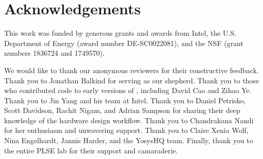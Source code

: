 \section*{Acknowledgements}

This work was funded
  by generous grants
  and awards
  from
  Intel,
  the U.S. Department
  of Energy (award number DE-SC0022081),
  and the NSF (grant numbers 1836724 and 1749570).






We would like to thank
  our anonymous reviewers
  for their constructive feedback.
Thank you to
  Jonathan Balkind for serving
  as our shepherd.
Thank you to those who contributed code
  to early versions of \lr, including
  David Cao and Zihao Ye.
Thank you to Jin Yang and his
  team at Intel.
Thank you to 
  Daniel Petrisko, Scott Davidson,
  Rachit Nigam, and Adrian Sampson
  for sharing their deep knowledge of
  the hardware design workflow.
Thank you to Chandrakana Nandi
  for her enthusiasm and unwavering support.
Thank you to Claire Xenia Wolf, Nina Engelhardt,
  Jannis Harder,
  and the YosysHQ team.
Finally, thank you to the entire PLSE lab
  for their support and camaraderie.
  